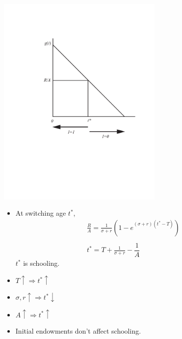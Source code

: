 \documentclass[12pt,compress,handout]{beamer}  %
\begin{document}
\begin{frame}
\begin{center}
\includegraphics[width=3.2in]{include/fig-shesh-rule.pdf}
\end{center}
\end{frame}


\begin{frame}
\begin{itemize}[<+->]
\item At switching age $t^{*}$,
\begin{gather*}
\frac RA=\frac{1}{\sigma +r}\left(1-e^{(\sigma +r)(t^{*}-T)}\right) \\
\\
t^{*}=T+\frac{1}{\sigma +r}-\dfrac 1A
\end{gather*}
$t^{*}$ is schooling.
\bigskip

\item $T\uparrow \Rightarrow t^{*} \uparrow $

\item $\sigma ,r\uparrow \Rightarrow t^{*} \downarrow $

\item $A\uparrow \Rightarrow t^{*} \uparrow $

\item Initial endowments don't affect schooling.
\end{itemize}
\end{frame}
\end{document}
